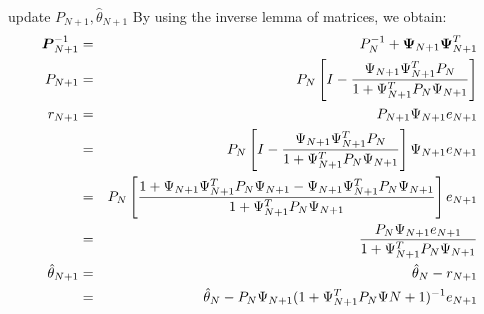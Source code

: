 \bgroup
{}
\begin{frame}{update $P_{N+1},\hat\theta_{N+1}$}
 By using the inverse lemma of matrices, we obtain: 
\begin{eqnarray*}
\boldsymbol{P}_{N+1}^{-1} &=& P_N^{-1}+\boldsymbol{\Psi}_{N+1}\boldsymbol{\Psi}_{N+1}^T  \\
P_{N+1}&=& P_N\left[I-\frac{\Psi_{N+1}\Psi_{N+1}^T P_N}{1+\Psi_{N+1}^T P_N \Psi_{N+1}}\right] \\
r_{N+1}&=&P_{N+1}\Psi_{N+1}e_{N+1} \\
&=&P_N\left[I-\frac{\Psi_{N+1}\Psi_{N+1}^T P_N}{1+\Psi_{N+1}^T P_N\Psi_{N+1}}\right]\Psi_{N+1}e_{N+1} \\
&=&P_N\left[\frac{1+\Psi_{N+1}\Psi_{N+1}^T P_N\Psi_{N+1}-\Psi_{N+1}\Psi_{N+1}^T P_N \Psi_{N+1}}{1+\Psi_{N+1}^T P_N\Psi_{N+1}}\right]e_{N+1} \\
&=&\frac{P_N\Psi_{N+1}e_{N+1}}{1+\Psi_{N+1}^T P_N \Psi_{N+1}} \\
\hat\theta_{N+1}&=&\hat\theta_N-r_{N+1}\\
&=&\hat\theta_N-P_N\Psi_{N+1}(1+\Psi_{N+1}^T P_N \Psi{N+1})^{-1}e_{N+1}
\end{eqnarray*}
\end{frame}
\egroup


